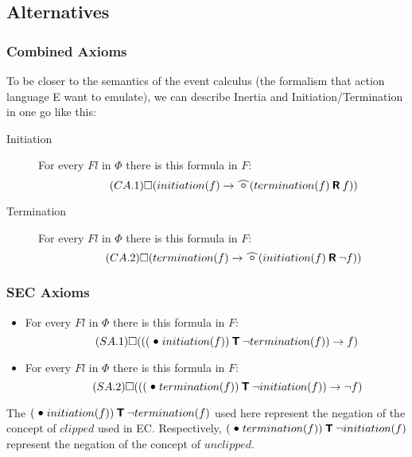\subsection{Alternatives}

\subsubsection{Combined Axioms}

To be closer to the semantics of the event calculus (the formalism that action language E want to emulate), we can describe Inertia and Initiation/Termination in one go like this:
\begin{description}
  \item[Initiation]
  For every $Fl$ in $\Phi$ there is this formula in $F$:
  \begin{equation}\tag{$CA.1$}
    \alwaysF(initiation(f)\rightarrow\wnext(termination(f) \release f))
  \end{equation}
  \item[Termination]
  For every $Fl$ in $\Phi$ there is this formula in $F$:
  \begin{equation}\tag{$CA.2$}
    \alwaysF(termination(f)\rightarrow\wnext(initiation(f) \release \neg f))
  \end{equation}
\end{description}

\subsubsection{SEC Axioms}

\begin{itemize}
  \item
    For every $Fl$ in $\Phi$ there is this formula in $F$:
    \begin{equation}\tag{$SA.1$}
      \alwaysF(((\previous initiation(f)) \trigger \neg termination(f)) \rightarrow f)
    \end{equation}
  \item
    For every $Fl$ in $\Phi$ there is this formula in $F$:
    \begin{equation}\tag{$SA.2$}
      \alwaysF(((\previous termination(f)) \trigger \neg initiation(f)) \rightarrow \neg f)
    \end{equation}
\end{itemize}

The $(\previous initiation(f)) \trigger \neg termination(f)$ used here represent the negation of the concept of $clipped$ used in EC.
Respectively, $(\previous termination(f)) \trigger \neg initiation(f)$ represent the negation of the concept of $unclipped$.


